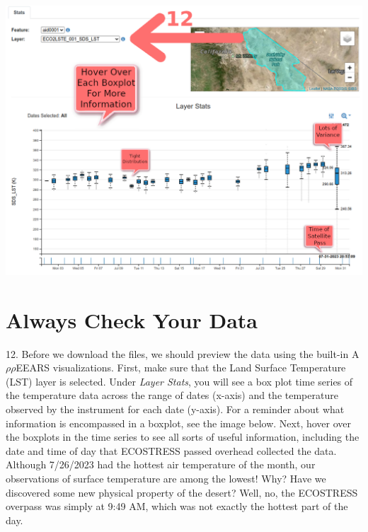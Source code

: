 \documentclass[oneside,a4paper,11pt,explicit]{book}
\begin{document}

\centerline{\includegraphics[width=\textwidth]{ExploreLST.png}}

\section{Always Check Your Data} 

12. Before we download the files, we should preview the data using the built-in A$\rho\rho$EEARS visualizations. First, make sure that the Land Surface Temperature (LST) layer is selected. Under \textit{Layer Stats}, you will see a box plot time series of the temperature data across the range of dates (x-axis) and the temperature observed by the instrument for each date (y-axis). For a reminder about what information is encompassed in a boxplot, see the image below. Next, hover over the boxplots in the time series to see all sorts of useful information, including the date and time of day that ECOSTRESS passed overhead collected the data. Although 7/26/2023 had the hottest air temperature of the month, our observations of surface temperature are among the lowest! Why? Have we discovered some new physical property of the desert? Well, no, the ECOSTRESS overpass was simply at 9:49 AM, which was not exactly the hottest part of the day.

\end{document}
